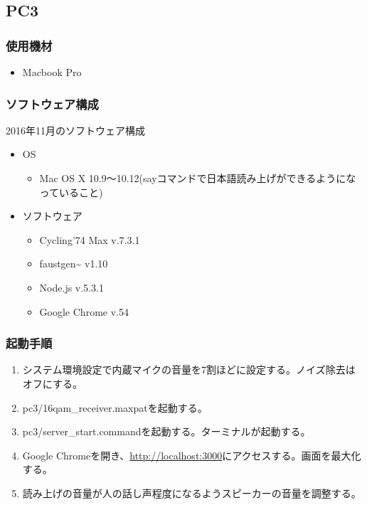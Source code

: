 \documentclass[a4paper]{jsarticle}
\begin{document}
\subsection{PC3}\label{pc3}

\subsubsection{使用機材}\label{ux4f7fux7528ux6a5fux6750-1}

\begin{itemize}
\tightlist
\item
  Macbook Pro
\end{itemize}

\subsubsection{ソフトウェア構成}\label{ux30bdux30d5ux30c8ux30a6ux30a7ux30a2ux69cbux6210-1}

2016年11月のソフトウェア構成

\begin{itemize}
\tightlist
\item
  OS

  \begin{itemize}
  \tightlist
  \item
    Mac OS X
    10.9〜10.12(sayコマンドで日本語読み上げができるようになっていること)
  \end{itemize}
\item
  ソフトウェア

  \begin{itemize}
  \tightlist
  \item
    Cycling'74 Max v.7.3.1
  \item
    faustgen\textasciitilde{} v1.10
  \item
    Node.js v.5.3.1
  \item
    Google Chrome v.54
  \end{itemize}
\end{itemize}

\subsubsection{起動手順}\label{ux8d77ux52d5ux624bux9806-1}

\begin{enumerate}
\def\labelenumi{\arabic{enumi}.}
\setcounter{enumi}{-1}
\tightlist
\item
  システム環境設定で内蔵マイクの音量を7割ほどに設定する。ノイズ除去はオフにする。
\item
  pc3/16qam\_receiver.maxpatを起動する。
\item
  pc3/server\_start.commandを起動する。ターミナルが起動する。
\item
  Google
  Chromeを開き、\url{http://localhost:3000}にアクセスする。画面を最大化する。
\item
  読み上げの音量が人の話し声程度になるようスピーカーの音量を調整する。
\end{enumerate}
\end{document}
